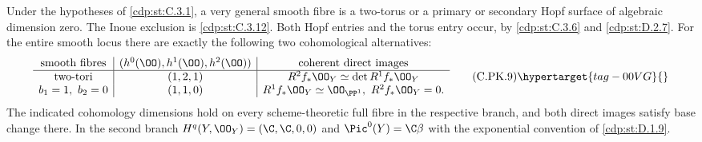 \begin{proposition}\hypertarget{tag-01F6}{}\label{cdp:st:C.3.11}


Under the hypotheses of \ref{cdp:st:C.3.1}, a very general smooth fibre
is a two-torus or a primary or secondary Hopf surface of
algebraic dimension zero. The Inoue exclusion is \ref{cdp:st:C.3.12}.
Both Hopf
entries and the torus entry occur, by \ref{cdp:st:C.3.6} and \ref{cdp:st:D.2.7}.
For the entire smooth locus there are exactly the following
two cohomological alternatives:
\[
\begin{array}{c|c|c}
\text{smooth fibres}&
 (h^0(\OO),h^1(\OO),h^2(\OO))&
 \text{coherent direct images}\\ \hline
\text{two-tori}&(1,2,1)&
 R^2f_*\OO_Y\simeq\det R^1f_*\OO_Y\\
b_1=1,\ b_2=0&(1,1,0)&
 R^1f_*\OO_Y\simeq\OO_{\PP^1},\
 R^2f_*\OO_Y=0 .
\end{array}
\tag{C.PK.9}\hypertarget{tag-00VG}{}\label{cdp:eq:C.PK.9}
\]
The indicated cohomology dimensions hold on every
scheme-theoretic full fibre in the respective branch,
and both direct images satisfy base change there.
In the second branch
$H^q(Y,\OO_Y)=(\C,\C,0,0)$ and
$\Pic^0(Y)=\C\beta$ with the exponential convention
of \ref{cdp:st:D.1.9}.
\end{proposition}


